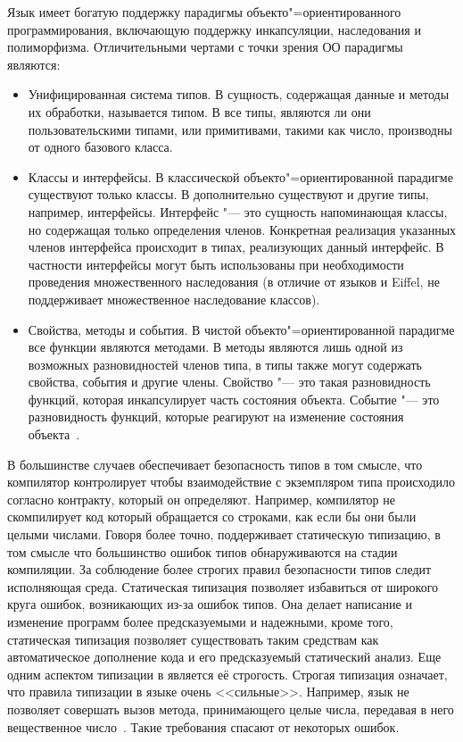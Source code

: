 Язык имеет богатую поддержку парадигмы объекто"=ориентированного программирования, включающую поддержку инкапсуляции, наследования и полиморфизма.
Отличительными чертами \csharp{} с точки зрения ОО парадигмы являются:
\begin{itemize}
  \item Унифицированная система типов.
        В \csharp{} сущность, содержащая данные и методы их обработки, называется типом.
        В \csharp{} все типы, являются ли они пользовательскими типами, или примитивами, такими как число, производны от одного базового класса.
  \item Классы и интерфейсы.
        В классической объекто"=ориентированной парадигме существуют только классы.
        В \csharp{} дополнительно существуют и другие типы, например, интерфейсы.
        Интерфейс "--- это сущность напоминающая классы, но содержащая только определения членов.
        Конкретная реализация указанных членов интерфейса происходит в типах, реализующих данный интерфейс.
        В частности интерфейсы могут быть использованы при необходимости проведения множественного наследования (в отличие от языков \cpp{} и Eiffel, \csharp{} не поддерживает множественное наследование классов).
  \item Свойства, методы и события.
        В чистой объекто"=ориентированной парадигме все функции являются методами.
        В \csharp{} методы являются лишь одной из возможных разновидностей членов типа, в \csharp{} типы также могут содержать свойства, события и другие члены.
        Свойство "--- это такая разновидность функций, которая инкапсулирует часть состояния объекта.
        Событие "--- это разновидность функций, которые реагируют на изменение состояния объекта~\cite{albahari_2012_en}.
\end{itemize}

В большинстве случаев \csharp{} обеспечивает безопасность типов в том смысле, что компилятор контролирует чтобы взаимодействие с экземпляром типа происходило согласно контракту, который он определяют.
Например, компилятор \csharp{} не скомпилирует код который обращается со строками, как если бы они были целыми числами.
Говоря более точно, \csharp{} поддерживает статическую типизацию, в том смысле что большинство ошибок типов обнаруживаются на стадии компиляции.
За соблюдение более строгих правил безопасности типов следит исполняющая среда.
Статическая типизация позволяет избавиться от широкого круга ошибок, возникающих из-за ошибок типов.
Она делает написание и изменение программ более предсказуемыми и надежными, кроме того, статическая типизация позволяет существовать таким средствам как автоматическое дополнение кода и его предсказуемый статический анализ.
Еще одним аспектом типизации в \csharp{} является её строгость.
Строгая типизация означает, что правила типизации в языке очень <<сильные>>.
Например, язык не позволяет совершать вызов метода, принимающего целые числа, передавая в него вещественное число~\cite{albahari_2012_en}.
Такие требования спасают от некоторых ошибок.

